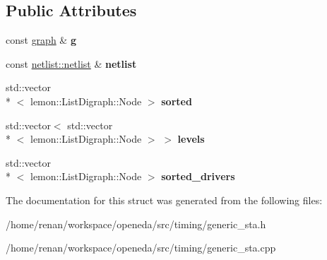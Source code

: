 \subsection*{Public Attributes}
\begin{DoxyCompactItemize}
\item 
\hypertarget{structophidian_1_1timing_1_1graph__and__topology_a782bda4d0a09ae4df746e2a5be93fcf1}{const \hyperlink{classophidian_1_1timing_1_1graph}{graph} \& {\bfseries g}}\label{structophidian_1_1timing_1_1graph__and__topology_a782bda4d0a09ae4df746e2a5be93fcf1}

\item 
\hypertarget{structophidian_1_1timing_1_1graph__and__topology_aab364388e8bb4a22397f27d46798cd99}{const \hyperlink{classophidian_1_1netlist_1_1netlist}{netlist\-::netlist} \& {\bfseries netlist}}\label{structophidian_1_1timing_1_1graph__and__topology_aab364388e8bb4a22397f27d46798cd99}

\item 
\hypertarget{structophidian_1_1timing_1_1graph__and__topology_a49bcee6d055c958796984c19e10aa691}{std\-::vector\\*
$<$ lemon\-::\-List\-Digraph\-::\-Node $>$ {\bfseries sorted}}\label{structophidian_1_1timing_1_1graph__and__topology_a49bcee6d055c958796984c19e10aa691}

\item 
\hypertarget{structophidian_1_1timing_1_1graph__and__topology_a44d63c4dc19d5a0fbc2f835494af2179}{std\-::vector$<$ std\-::vector\\*
$<$ lemon\-::\-List\-Digraph\-::\-Node $>$ $>$ {\bfseries levels}}\label{structophidian_1_1timing_1_1graph__and__topology_a44d63c4dc19d5a0fbc2f835494af2179}

\item 
\hypertarget{structophidian_1_1timing_1_1graph__and__topology_a209197e9025a93f98aa9795570d3973f}{std\-::vector\\*
$<$ lemon\-::\-List\-Digraph\-::\-Node $>$ {\bfseries sorted\-\_\-drivers}}\label{structophidian_1_1timing_1_1graph__and__topology_a209197e9025a93f98aa9795570d3973f}

\end{DoxyCompactItemize}


The documentation for this struct was generated from the following files\-:\begin{DoxyCompactItemize}
\item 
/home/renan/workspace/openeda/src/timing/generic\-\_\-sta.\-h\item 
/home/renan/workspace/openeda/src/timing/generic\-\_\-sta.\-cpp\end{DoxyCompactItemize}
